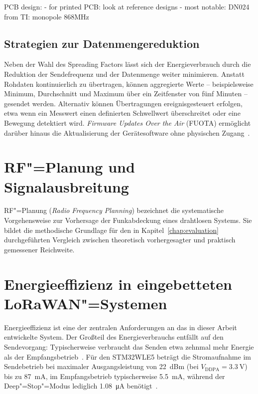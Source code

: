 PCB design:
  - for printed PCB: look at reference designs
  - most notable: DN024 from TI: monopole 868MHz


\subsection{Strategien zur Datenmengereduktion}
\label{subsec:datenreduktion}

Neben der Wahl des Spreading Factors lässt sich der Energieverbrauch durch die
Reduktion der Sendefrequenz und der Datenmenge weiter minimieren. Anstatt Rohdaten
kontinuierlich zu übertragen, können aggregierte Werte -- beispielsweise Minimum,
Durchschnitt und Maximum über ein Zeitfenster von fünf Minuten -- gesendet werden.
Alternativ können Übertragungen ereignisgesteuert erfolgen, etwa wenn ein Messwert
einen definierten Schwellwert überschreitet oder eine Bewegung detektiert wird.
\textit{Firmware Updates Over the Air} (FUOTA) ermöglicht darüber hinaus die
Aktualisierung der Gerätesoftware ohne physischen Zugang~\cite{semtech_lora_basics}.

\section{RF"=Planung und Signalausbreitung}
\label{sec:rf-planung}

RF"=Planung (\textit{Radio Frequency Planning}) bezeichnet die systematische
Vorgehensweise zur Vorhersage der Funkabdeckung eines drahtlosen Systems.
Sie bildet die methodische Grundlage für den in Kapitel~\ref{chap:evaluation}
durchgeführten Vergleich zwischen theoretisch vorhergesagter und praktisch
gemessener Reichweite.

\section{Energieeffizienz in eingebetteten LoRaWAN"=Systemen}
\label{sec:energieeffizienz}

Energieeffizienz ist eine der zentralen Anforderungen an das in dieser Arbeit
entwickelte System. Der Großteil des Energieverbrauchs entfällt auf den Sendevorgang:
Typischerweise verbraucht das Senden etwa zehnmal mehr Energie als der
Empfangsbetrieb~\cite{semtech_lora_basics}. Für den STM32WLE5 beträgt die Stromaufnahme
im Sendebetrieb bei maximaler Ausgangsleistung von \SI{22}{dBm} (bei $V_\text{DDPA} =
\SI{3.3}{\V}$) bis zu \SI{87}{\mA}, im Empfangsbetrieb typischerweise \SI{5.5}{\mA},
während der Deep"=Stop"=Modus lediglich \SI{1.08}{\uA} benötigt~\cite{stm32wl_ds}.


